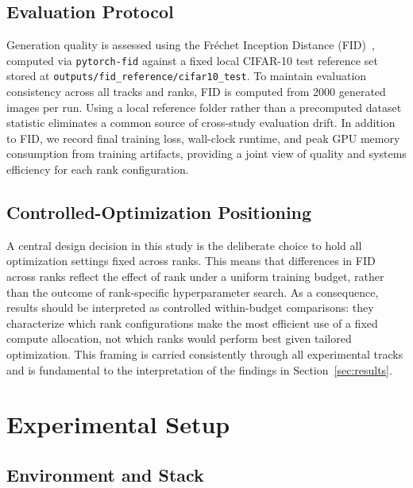 \documentclass[pdflatex,sn-mathphys-num]{Springer_format/sn-jnl}
\begin{document}
  \subsection{Evaluation Protocol}
  
  Generation quality is assessed using the Fr\'{e}chet Inception Distance
  (FID)~\cite{heusel2017fid}, computed via \texttt{pytorch-fid} against a fixed local
  CIFAR-10 test reference set stored at \texttt{outputs/fid\_reference/cifar10\_test}. To
  maintain evaluation consistency across all tracks and ranks, FID is computed from 2000
  generated images per run. Using a local reference folder rather than a precomputed dataset
  statistic eliminates a common source of cross-study evaluation drift. In addition to FID,
  we record final training loss, wall-clock runtime, and peak GPU memory consumption from
  training artifacts, providing a joint view of quality and systems efficiency for each rank
  configuration.
  
  \subsection{Controlled-Optimization Positioning}
  
  A central design decision in this study is the deliberate choice to hold all optimization
  settings fixed across ranks. This means that differences in FID across ranks reflect the
  effect of rank under a uniform training budget, rather than the outcome of rank-specific
  hyperparameter search. As a consequence, results should be interpreted as controlled
  within-budget comparisons: they characterize which rank configurations make the most
  efficient use of a fixed compute allocation, not which ranks would perform best given
  tailored optimization. This framing is carried consistently through all experimental tracks
  and is fundamental to the interpretation of the findings in Section~\ref{sec:results}.
  
  \section{Experimental Setup}
  \label{sec:experiments}
  
  \subsection{Environment and Stack}
  
\end{document}
